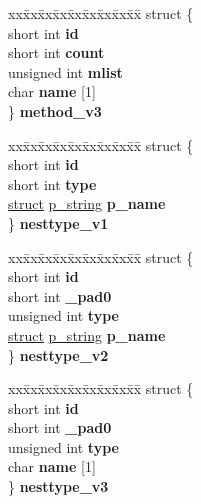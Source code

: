\begin{DoxyCompactItemize}
\begin{tabbing}
\end{tabbing}\item 
\mbox{\label{unioncodeview__fieldtype_af2112b305bb35522e165545ed9c19967}} 
\begin{tabbing}
xx\=xx\=xx\=xx\=xx\=xx\=xx\=xx\=xx\=\kill
struct \{\\
\>short int {\bfseries id}\\
\>short int {\bfseries count}\\
\>unsigned int {\bfseries mlist}\\
\>char {\bfseries name} \mbox{[}1\mbox{]}\\
\} {\bfseries method\_v3}\\

\end{tabbing}\item 
\mbox{\label{unioncodeview__fieldtype_afadf86e12dab8f3196994c0826ef3ee1}} 
\begin{tabbing}
xx\=xx\=xx\=xx\=xx\=xx\=xx\=xx\=xx\=\kill
struct \{\\
\>short int {\bfseries id}\\
\>short int {\bfseries type}\\
\>\hyperlink{interfacestruct}{struct} \hyperlink{structp__string}{p\_string} {\bfseries p\_name}\\
\} {\bfseries nesttype\_v1}\\

\end{tabbing}\item 
\mbox{\label{unioncodeview__fieldtype_a87dbd6336cb73fd725aa1a5a30320258}} 
\begin{tabbing}
xx\=xx\=xx\=xx\=xx\=xx\=xx\=xx\=xx\=\kill
struct \{\\
\>short int {\bfseries id}\\
\>short int {\bfseries \_pad0}\\
\>unsigned int {\bfseries type}\\
\>\hyperlink{interfacestruct}{struct} \hyperlink{structp__string}{p\_string} {\bfseries p\_name}\\
\} {\bfseries nesttype\_v2}\\

\end{tabbing}\item 
\mbox{\label{unioncodeview__fieldtype_ad231505b3cc4685f19dfcbb4c2a4e96b}} 
\begin{tabbing}
xx\=xx\=xx\=xx\=xx\=xx\=xx\=xx\=xx\=\kill
struct \{\\
\>short int {\bfseries id}\\
\>short int {\bfseries \_pad0}\\
\>unsigned int {\bfseries type}\\
\>char {\bfseries name} \mbox{[}1\mbox{]}\\
\} {\bfseries nesttype\_v3}\\


\end{tabbing}
\end{DoxyCompactItemize}
